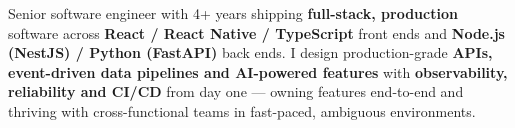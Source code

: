 
\begin{cvparagraph}
Senior software engineer with 4+ years shipping \textbf{full-stack, production} software across \textbf{React / React Native / TypeScript} front ends and \textbf{Node.js (NestJS) / Python (FastAPI)} back ends. I design production-grade \textbf{APIs, event-driven data pipelines and AI-powered features} with \textbf{observability, reliability and CI/CD} from day one --- owning features end-to-end and thriving with cross-functional teams in fast-paced, ambiguous environments.
\end{cvparagraph}
